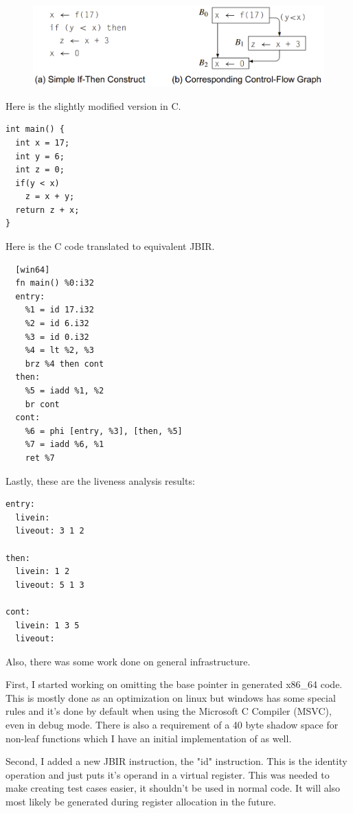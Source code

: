 \documentclass[11pt, a4paper, titlepage]{article}
\begin{document}
\begin{figure}[H]
  \centering
  \includegraphics[scale=0.3]{images/i1.png}
\end{figure}

Here is the slightly modified version in C.

\begin{lstlisting}
int main() {
  int x = 17;
  int y = 6;
  int z = 0;
  if(y < x)
    z = x + y;
  return z + x;
}
\end{lstlisting}

Here is the C code translated to equivalent JBIR.

\begin{lstlisting}
  [win64]
  fn main() %0:i32
  entry:
    %1 = id 17.i32
    %2 = id 6.i32
    %3 = id 0.i32
    %4 = lt %2, %3
    brz %4 then cont
  then:
    %5 = iadd %1, %2
    br cont
  cont:
    %6 = phi [entry, %3], [then, %5]
    %7 = iadd %6, %1
    ret %7
\end{lstlisting}

Lastly, these are the liveness analysis results:

\begin{lstlisting}
entry:
  livein:
  liveout: 3 1 2

then:
  livein: 1 2
  liveout: 5 1 3

cont:
  livein: 1 3 5
  liveout:
\end{lstlisting}

Also, there was some work done on general infrastructure.

First, I started working on omitting the base pointer in generated x86\_64 code.
This is mostly done as an optimization on linux but windows has some special rules and it's done by default when using the Microsoft C Compiler (MSVC), even in debug mode.
There is also a requirement of a 40 byte shadow space for non-leaf functions which I have an initial implementation of as well.

Second, I added a new JBIR instruction, the "id" instruction. This is the identity operation and just puts it's operand in a virtual register. This was needed to make creating test cases easier, it shouldn't be used in normal code. It will also most likely be generated during register allocation in the future.
\end{document}
